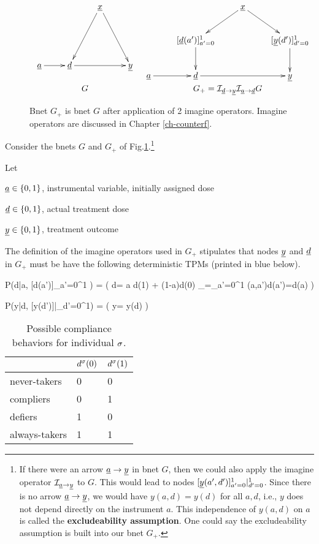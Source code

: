 \begin{figure}[h!]
$$
\begin{array}{ccccc}
\xymatrix{
&&\rvx\ar[ddl]\ar[ddr]
\\
\\
\rva\ar[r]
&\rvd\ar[rr]&&\rvy
}
&
\xymatrix{
&&\rvx\ar[dl]\ar[dr]
\\
&
[\rvd(a')]_{a'=0}^1\ar[d]
&
&[\rvy(d')]_{d'=0}^1\ar[d]
\\
\rva\ar[r]
&\rvd\ar[rr]&&\rvy
}
\\
G
&
G_+=
\cali_{\rvd\rarrow \rvy}
\cali_{\rva\rarrow \rvd}G
\end{array}
$$
\caption{
Bnet $G_+$ is bnet $G$
after application of 2
imagine operators.
Imagine operators
are discussed in Chapter \ref{ch-counterf}.
}
\label{fig-late-g-gplus}
\end{figure}

Consider
the bnets
$G$
and $G_+$
of 
Fig.\ref{fig-late-g-gplus}.\footnote{If there were an arrow
$\rva\rarrow \rvy$
in bnet $G$,
then we could also
apply the imagine 
operator $\cali_{\rva\rarrow
\rvy}$ to $G$.
This would lead to
nodes 
$[\rvy(a',d')]_{a'=0}^1|_{d'=0}^1$.
Since
there is no arrow
$\rva\rarrow \rvy$, we would have
$y(a, d)=y(d)$
for all $a,d$,
i.e., $y$
does not depend
directly on 
the instrument $a$.
This independence
of $y(a,d)$ on $a$ is called the
{\bf excludeability
assumption}.
One could say
the excludeability
assumption
is built into
our bnet $G_+$.}

Let

$\rva\in \bool$, instrumental
variable,
initially assigned dose

$\rvd\in \bool$, actual treatment 
dose

$\rvy\in \bool$, treatment outcome

The  definition of the 
imagine
operators 
used in $G_+$
stipulates
that nodes
$\rvy$ and
$\rvd$
in $G_{+}$
must be have the following
deterministic TPMs
(printed in blue below).


\beq\color{blue}
P(d|a,
[d(a')]_{a'=0}^1
) = \indi(\quad
d= \underbrace 
{a d(1) + (1-a)d(0)}
_{=\sum_{a'=0}^1
\delta(a,a')d(a')\quad=\quad d(a)}
\quad)
\eeq

\beq\color{blue}
P(y|d,
[y(d')]|_{d'=0}^1)
= \indi(\quad
y= 
y(d)
\quad)
\eeq

\begin{table}[h!]
\centering
\begin{tabular}{|l|l|l|}
\hline
 & \cellcolor[HTML]{ECF4FF}$d^\sigma(0)$ & \cellcolor[HTML]{ECF4FF}$d^\sigma(1)$ \\ \hline
\cellcolor[HTML]{ECF4FF}never-takers & 0 & 0 \\ \hline
\cellcolor[HTML]{ECF4FF}compliers & 0 & 1 \\ \hline
\cellcolor[HTML]{ECF4FF}defiers & 1 & 0 \\ \hline
\cellcolor[HTML]{ECF4FF}always-takers & 1 & 1 \\ \hline
\end{tabular}
\caption{Possible compliance
behaviors  for individual $\sigma$.}
\label{tab-late compliance}
\end{table}

